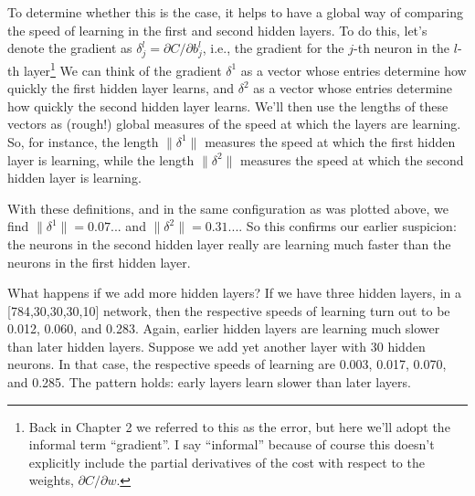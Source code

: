 \documentclass[a4paper,twoside,10pt]{book}
\begin{document}
To determine whether this is the case, it helps to have a global way of comparing the speed of learning in the first and second hidden layers. To do this, let's denote the gradient as $\delta^l_j=\partial C/\partial b^l_j$, i.e., the gradient for the $j$-th neuron in the $l$-th layer\footnote{Back in Chapter 2 we referred to this as the error, but here we'll adopt the informal term ``gradient''. I say ``informal'' because of course this doesn't explicitly include the partial derivatives of the cost with respect to the weights, $\partial C/\partial w$.}  We can think of the gradient $\delta^1$ as a vector whose entries determine how quickly the first hidden layer learns, and $\delta^2$ as a vector whose entries determine how quickly the second hidden layer learns. We'll then use the lengths of these vectors as (rough!) global measures of the speed at which the layers are learning. So, for instance, the length $\|\delta^1\|$ measures the speed at which the first hidden layer is learning, while the length $\|\delta^2\|$ measures the speed at which the second hidden layer is learning.

With these definitions, and in the same configuration as was plotted above, we find $\|\delta^1\| = 0.07...$ and $\|\delta^2\|=0.31...$. So this confirms our earlier suspicion: the neurons in the second hidden layer really are learning much faster than the neurons in the first hidden layer.

What happens if we add more hidden layers? If we have three hidden layers, in a [784,30,30,30,10] network, then the respective speeds of learning turn out to be 0.012, 0.060, and 0.283. Again, earlier hidden layers are learning much slower than later hidden layers. Suppose we add yet another layer with 30 hidden neurons. In that case, the respective speeds of learning are 0.003, 0.017, 0.070, and 0.285. The pattern holds: early layers learn slower than later layers.
\end{document}
